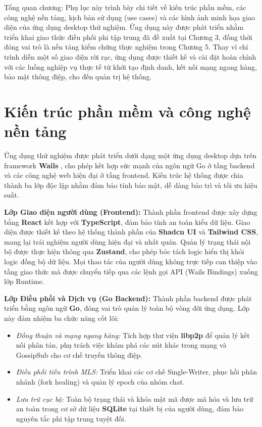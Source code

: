 \documentclass[../DoAn.tex]{subfiles}
\begin{document}
Tổng quan chương: Phụ lục này trình bày chi tiết về kiến trúc phần mềm, các công nghệ nền tảng, kịch bản sử dụng (use cases) và các hình ảnh minh họa giao diện của ứng dụng desktop thử nghiệm. Ứng dụng này được phát triển nhằm triển khai giao thức điều phối phi tập trung đã đề xuất tại Chương 3, đồng thời đóng vai trò là nền tảng kiểm chứng thực nghiệm trong Chương 5. Thay vì chỉ trình diễn một số giao diện rời rạc, ứng dụng được thiết kế và cài đặt hoàn chỉnh với các luồng nghiệp vụ thực tế từ khởi tạo định danh, kết nối mạng ngang hàng, bảo mật thông điệp, cho đến quản trị hệ thống.

\section{Kiến trúc phần mềm và công nghệ nền tảng}

Ứng dụng thử nghiệm được phát triển dưới dạng một ứng dụng desktop dựa trên framework \textbf{Wails} \cite{wails2026doc}, cho phép kết hợp sức mạnh của ngôn ngữ Go ở tầng backend và các công nghệ web hiện đại ở tầng frontend. Kiến trúc hệ thống được chia thành ba lớp độc lập nhằm đảm bảo tính bảo mật, dễ dàng bảo trì và tối ưu hiệu suất.

\textbf{Lớp Giao diện người dùng (Frontend):}
Thành phần frontend được xây dựng bằng \textbf{React} kết hợp với \textbf{TypeScript}, đảm bảo tính an toàn kiểu dữ liệu. Giao diện được thiết kế theo hệ thống thành phần của \textbf{Shadcn UI} và \textbf{Tailwind CSS}, mang lại trải nghiệm người dùng hiện đại và nhất quán. Quản lý trạng thái nội bộ được thực hiện thông qua \textbf{Zustand}, cho phép bóc tách logic hiển thị khỏi logic đồng bộ dữ liệu. Mọi thao tác của người dùng không trực tiếp can thiệp vào tầng giao thức mà được chuyển tiếp qua các lệnh gọi API (Wails Bindings) xuống lớp Runtime.

\textbf{Lớp Điều phối và Dịch vụ (Go Backend):}
Thành phần backend được phát triển bằng ngôn ngữ \textbf{Go}, đóng vai trò quản lý toàn bộ vòng đời ứng dụng. Lớp này đảm nhiệm ba chức năng cốt lõi:
\begin{itemize}
    \item \textit{Đồng thuận và mạng ngang hàng:} Tích hợp thư viện \textbf{libp2p} để quản lý kết nối phân tán, phụ trách việc khám phá các nút khác trong mạng và GossipSub cho cơ chế truyền thông điệp.
    \item \textit{Điều phối tiến trình MLS:} Triển khai các cơ chế Single-Writer, phục hồi phân nhánh (fork healing) và quản lý epoch của nhóm chat.
    \item \textit{Lưu trữ cục bộ:} Toàn bộ trạng thái và khóa mật mã được mã hóa và lưu trữ an toàn trong cơ sở dữ liệu \textbf{SQLite} \cite{sqlite2026doc} tại thiết bị của người dùng, đảm bảo nguyên tắc phi tập trung tuyệt đối.
\end{itemize}
\end{document}
